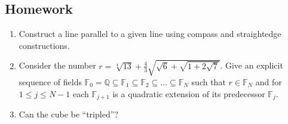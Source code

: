 \documentclass[11pt]{article}
\renewcommand\subset\subseteq
\theoremstyle{definition}
\newenvironment{solution}{{\it Solution.} }{\hfill {\color{lightgray}$\blacksquare$}}
\begin{document}
\newpage\subsection{Homework}

\begin{enumerate}
  \item Construct a line parallel to a given line using compass and straightedge constructions.

  \item Consider the number $r = \sqrt[4]{13}+\frac{4}{3}\sqrt{\sqrt{6}+\sqrt{1+2\sqrt{7}}}$. Give an explicit sequence of fields
  $\mathbb{F}_0 = \mathbb{Q} \subset \mathbb{F}_1 \subset \mathbb{F}_2 \subset \dots \subset \mathbb{F}_N$ such that $r \in \mathbb{F}_N$
  and for $1 \leq j \leq N-1$ each $\mathbb{F}_{j+1}$ is a quadratic extension of its predecessor $\mathbb{F}_j$.

  \item Can the cube be ``tripled''?


\end{enumerate}
\end{document}
